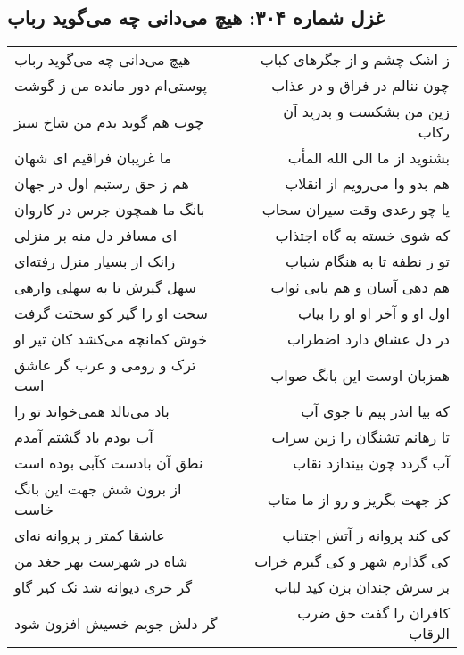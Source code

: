 \begin{center}
\section*{غزل شماره ۳۰۴: هیچ می‌دانی چه می‌گوید رباب}
\label{sec:0304}
\begin{longtable}{l p{0.5cm} r}
هیچ می‌دانی چه می‌گوید رباب
&&
ز اشک چشم و از جگرهای کباب
\\
پوستی‌ام دور مانده من ز گوشت
&&
چون ننالم در فراق و در عذاب
\\
چوب هم گوید بدم من شاخ سبز
&&
زین من بشکست و بدرید آن رکاب
\\
ما غریبان فراقیم ای شهان
&&
بشنوید از ما الی الله المأب
\\
هم ز حق رستیم اول در جهان
&&
هم بدو وا می‌رویم از انقلاب
\\
بانگ ما همچون جرس در کاروان
&&
یا چو رعدی وقت سیران سحاب
\\
ای مسافر دل منه بر منزلی
&&
که شوی خسته به گاه اجتذاب
\\
زانک از بسیار منزل رفته‌ای
&&
تو ز نطفه تا به هنگام شباب
\\
سهل گیرش تا به سهلی وارهی
&&
هم دهی آسان و هم یابی ثواب
\\
سخت او را گیر کو سختت گرفت
&&
اول او و آخر او او را بیاب
\\
خوش کمانچه می‌کشد کان تیر او
&&
در دل عشاق دارد اضطراب
\\
ترک و رومی و عرب گر عاشق است
&&
همزبان اوست این بانگ صواب
\\
باد می‌نالد همی‌خواند تو را
&&
که بیا اندر پیم تا جوی آب
\\
آب بودم باد گشتم آمدم
&&
تا رهانم تشنگان را زین سراب
\\
نطق آن بادست کآبی بوده است
&&
آب گردد چون بیندازد نقاب
\\
از برون شش جهت این بانگ خاست
&&
کز جهت بگریز و رو از ما متاب
\\
عاشقا کمتر ز پروانه نه‌ای
&&
کی کند پروانه ز آتش اجتناب
\\
شاه در شهرست بهر جغد من
&&
کی گذارم شهر و کی گیرم خراب
\\
گر خری دیوانه شد نک کیر گاو
&&
بر سرش چندان بزن کید لباب
\\
گر دلش جویم خسیش افزون شود
&&
کافران را گفت حق ضرب الرقاب
\\
\end{longtable}
\end{center}

